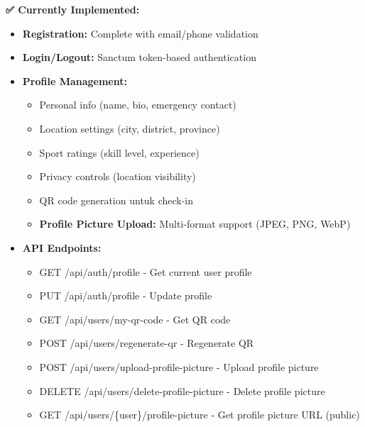 \documentclass[12pt,a4paper]{article}
\begin{document}
\begin{implemented}
\textbf{✅ Currently Implemented:}
\begin{itemize}
    \item \textbf{Registration:} Complete with email/phone validation
    \item \textbf{Login/Logout:} Sanctum token-based authentication
    \item \textbf{Profile Management:} 
    \begin{itemize}
        \item Personal info (name, bio, emergency contact)
        \item Location settings (city, district, province)
        \item Sport ratings (skill level, experience)
        \item Privacy controls (location visibility)
        \item QR code generation untuk check-in
        \item \textbf{Profile Picture Upload:} Multi-format support (JPEG, PNG, WebP)
    \end{itemize}
    \item \textbf{API Endpoints:}
    \begin{itemize}
        \item GET /api/auth/profile - Get current user profile
        \item PUT /api/auth/profile - Update profile
        \item GET /api/users/my-qr-code - Get QR code
        \item POST /api/users/regenerate-qr - Regenerate QR
        \item POST /api/users/upload-profile-picture - Upload profile picture
        \item DELETE /api/users/delete-profile-picture - Delete profile picture
        \item GET /api/users/\{user\}/profile-picture - Get profile picture URL (public)
    \end{itemize}
\end{itemize}
\end{implemented}
\end{document}
